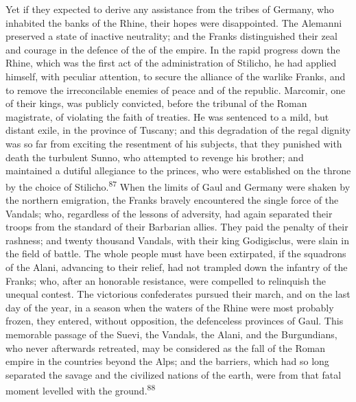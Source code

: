 Yet if they expected to derive any assistance from the tribes of
Germany, who inhabited the banks of the Rhine, their hopes were
disappointed. The Alemanni preserved a state of inactive
neutrality; and the Franks distinguished their zeal and courage
in the defence of the of the empire. In the rapid progress down
the Rhine, which was the first act of the administration of
Stilicho, he had applied himself, with peculiar attention, to
secure the alliance of the warlike Franks, and to remove the
irreconcilable enemies of peace and of the republic. Marcomir,
one of their kings, was publicly convicted, before the tribunal
of the Roman magistrate, of violating the faith of treaties. He
was sentenced to a mild, but distant exile, in the province of
Tuscany; and this degradation of the regal dignity was so far
from exciting the resentment of his subjects, that they punished
with death the turbulent Sunno, who attempted to revenge his
brother; and maintained a dutiful allegiance to the princes, who
were established on the throne by the choice of Stilicho.\textsuperscript{87} When
the limits of Gaul and Germany were shaken by the northern
emigration, the Franks bravely encountered the single force of
the Vandals; who, regardless of the lessons of adversity, had
again separated their troops from the standard of their Barbarian
allies. They paid the penalty of their rashness; and twenty
thousand Vandals, with their king Godigisclus, were slain in the
field of battle. The whole people must have been extirpated, if
the squadrons of the Alani, advancing to their relief, had not
trampled down the infantry of the Franks; who, after an honorable
resistance, were compelled to relinquish the unequal contest. The
victorious confederates pursued their march, and on the last day
of the year, in a season when the waters of the Rhine were most
probably frozen, they entered, without opposition, the
defenceless provinces of Gaul. This memorable passage of the
Suevi, the Vandals, the Alani, and the Burgundians, who never
afterwards retreated, may be considered as the fall of the Roman
empire in the countries beyond the Alps; and the barriers, which
had so long separated the savage and the civilized nations of the
earth, were from that fatal moment levelled with the ground.\textsuperscript{88}



